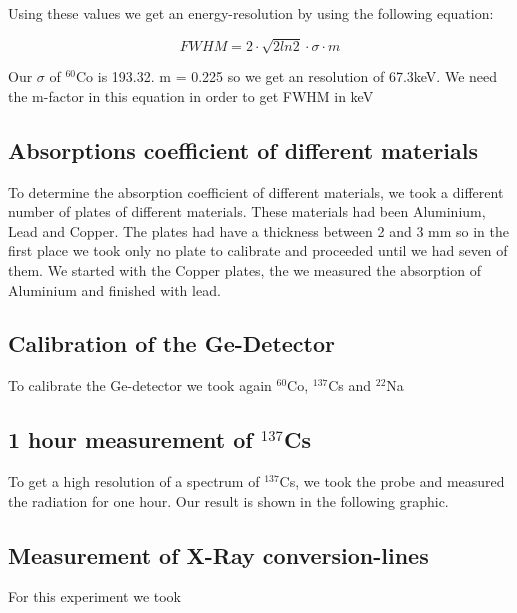 
Using these values we get an energy-resolution by using the following equation:

\begin{equation}
FWHM = 2\cdot \sqrt{2 ln 2} \cdot \sigma \cdot m
\end{equation}

Our $\sigma$ of $^{60}$Co is 193.32. m =  0.225 so we get an resolution of 67.3keV. We need the m-factor in this equation in order to get FWHM in keV

\subsection{Absorptions coefficient of different materials}
To determine the absorption coefficient of different materials, we took a different number of plates of different materials. These materials had been Aluminium, Lead and Copper. The plates had have a thickness between 2 and 3 mm so in the first place we took only no plate to calibrate and proceeded until we had seven of them. We started with the Copper plates, the we measured the absorption of Aluminium and finished with lead.

\subsection{Calibration of the Ge-Detector}
To calibrate the Ge-detector we took again $^{60}$Co, $^{137}$Cs and $^{22}$Na

\subsection{1 hour measurement of $^{137}$Cs}
To get a high resolution of a spectrum of $^{137}$Cs, we took the probe and measured the radiation for one hour. Our result is shown in the following graphic.


\subsection{Measurement of X-Ray conversion-lines}
For this experiment we took 